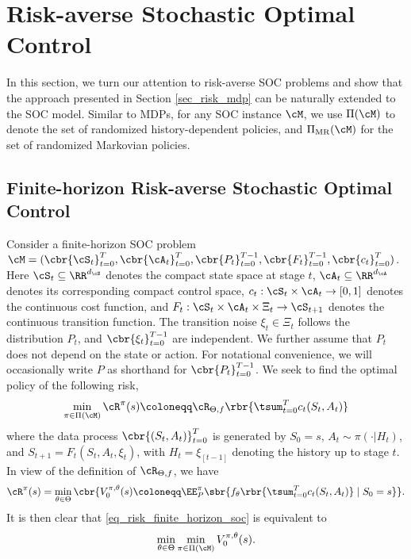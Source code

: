 \documentclass[9pt]{article}
\numberwithin{equation}{section}
\begin{document}

\section{Risk-averse Stochastic Optimal Control}\label{sec_soc}

In this section, we turn our attention to risk-averse SOC problems and show that the approach presented in Section \ref{sec_risk_mdp} can be naturally extended to the SOC model. 
Similar to MDPs, for any SOC instance $\cM$, we use $\Pi(\cM)$ to denote the set of randomized history-dependent policies,
and $\Pi_{\mathrm{MR}}(\cM)$ for the set of randomized Markovian policies.


\subsection{Finite-horizon Risk-averse Stochastic Optimal Control}


Consider a finite-horizon SOC problem 
$\cM = (
\cbr{\cS_t}_{t=0}^T, \cbr{\cA_t}_{t=0}^T, \cbr{P_t}_{t=0}^{T-1},
\cbr{F_t}_{t=0}^{T-1}, \cbr{c_t}_{t=0}^T
)$.
Here $\cS_t \subseteq \RR^{d_\cS}$ denotes the compact state space at stage $t$, 
$\cA_t \subseteq \RR^{d_\cA}$ denotes its corresponding compact control space, 
$c_t: \cS_t \times \cA_t \to [0,1]$ denotes the continuous cost function, and 
$F_t: \cS_t \times \cA_t \times \Xi_t \to \cS_{t+1}$ denotes the continuous transition function.
The transition noise $\xi_t \in \Xi_t$ follows  the distribution $P_t$, and $\cbr{\xi_t}_{t=0}^{T-1}$ are independent.
We further assume that $P_t$ does not depend on the state or action.
For notational convenience, we will occasionally write $P$ as shorthand for $\cbr{P_t}_{t=0}^{T-1}$.
We seek to find the optimal policy of the following risk,
\begin{align}\label{eq_risk_finite_horizon_soc}
    \min_{\pi \in \Pi(\cM)} \cR^\pi(s) \coloneqq
    \cR_{\Theta, f} \rbr{ \tsum_{t=0}^T c_t(S_t, A_t)}
\end{align}
where the data process $\cbr{(S_t,A_t)}_{t=0}^T$ is generated by 
$S_0=s$, $A_t \sim \pi(\cdot|H_t)$, and 
$S_{t+1}=F_t(S_t,A_t,\xi_t)$, with $H_t=\xi_{[t-1]}$ denoting the history up to stage $t$.
In view of the definition of $\cR_{\Theta,f}$, we have
\begin{align}\label{value_given_theta_finite_horizon_soc}
    \cR^\pi(s)
    =
    \min_{\theta \in \Theta} \cbr{
    V_0^{\pi,\theta}(s)
    \coloneqq
    \EE^\pi_P \sbr{
    f_\theta \rbr{\tsum_{t=0}^T c_t(S_t,A_t)}
    \mid S_0=s
    }}.
\end{align}
It is then clear that \eqref{eq_risk_finite_horizon_soc} is equivalent to
\begin{align}\label{finite_horizon_minmin_soc}
    \min_{\theta \in \Theta} \min_{\pi \in \Pi(\cM)} V_0^{\pi,\theta}(s).
\end{align}
\end{document}
